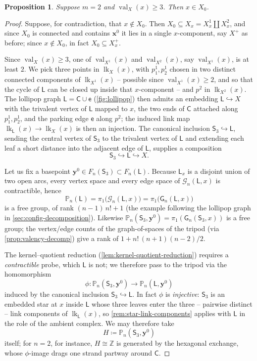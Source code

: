 \documentclass[reqno]{amsart}
\newtheorem{proposition}[theorem]{Proposition}
\theoremstyle{definition}
\newcommand\bfx{\mathbf{x}}
\newcommand\bfy{\mathbf{y}}
\newcommand\cG{\mathcal{G}}
\newcommand\sfG{\mathsf{G}}
\newcommand\sfS{\mathsf{S}}
\newcommand\sfe{\mathsf{e}}
\newcommand{\PB}{\mathbb{P}}
\newcommand{\Z}{\mathbb{Z}}
\newcommand{\base}{\bfx^0}
\newcommand{\Lollipop}{\mathsf{L}}
\DeclareMathOperator{\lk}{lk}
\DeclareMathOperator{\val}{val}
\numberwithin{equation}{section}
\begin{document}
\begin{proposition}\label{prop:X0-contains-m2-val3}
Suppose \(m=2\) and \(\val_X(x)\geq 3\). Then \(x\in X_0\).
\end{proposition}

\begin{proof}
Suppose, for contradiction, that \(x\notin X_0\). Then
\(X_0\subseteq X_x = X^1_x\coprod X^2_x\), and since \(X_0\) is
connected and contains \(\base\) it lies in a single
\(x\)-component, say \(X^+\) as before; since \(x\notin X_0\), in
fact \(X_0\subseteq X^+_x\).

Since \(\val_X(x)\geq 3\), one of \(\val_{X^1}(x)\) and
\(\val_{X^2}(x)\), say \(\val_{X^1}(x)\), is at least \(2\). We
pick three points in \(\lk_X(x)\), with \(p^1_1,p^1_2\) chosen in two
distinct connected components of \(\lk_{X^1}(x)\) -- possible since
\(\val_{X^1}(x)\geq2\), and so that the cycle of \(\Lollipop\) can be
closed up inside that \(x\)-component -- and \(p^2\) in \(\lk_{X^2}(x)\). The lollipop graph
\(\Lollipop=\mathsf{C}\cup\mathsf{\sfe}\)
(\cref{fig:lollipop}) then admits an embedding
\(\Lollipop\hookrightarrow X\) with the trivalent vertex of
\(\Lollipop\) mapped to \(x\), the two ends of \(\mathsf{C}\) attached
along \(p^1_1,p^1_2\), and the parking edge \(\mathsf{\sfe}\) along \(p^2\);
the induced link map \(\lk_{\Lollipop}(x)\to\lk_X(x)\) is then an
injection. The canonical inclusion
\(\sfS_3\hookrightarrow\Lollipop\), sending the central
vertex of \(\sfS_3\) to the trivalent vertex of \(\Lollipop\)
and extending each leaf a short distance into the adjacent edge
of \(\Lollipop\), supplies a composition
\[
\sfS_3 \hookrightarrow \Lollipop \hookrightarrow X.
\]

Let us fix a basepoint \(\bfy^0\in F_n(\sfS_3)\subset F_n(\Lollipop)\).
Because \(\Lollipop_x\) is a disjoint
union of two open arcs, every vertex space and every edge space
of \(\cG_n(\Lollipop,x)\) is contractible, hence
\[
\PB_n(\Lollipop)
=\pi_1\bigl(\cG_n(\Lollipop,x)\bigr)
=\pi_1\bigl(\sfG_n(\Lollipop,x)\bigr)
\]
is a free group, of rank \((n-1)\,n!+1\) (the example following the
lollipop graph in
\cref{sec:config-decomposition}). Likewise
\(\PB_n(\sfS_3,\bfy^0)=\pi_1(\sfG_n(\sfS_3,x))\) is
a free group; the vertex/edge counts of the graph-of-spaces of
the tripod (via \cref{prop:valency-decomp}) give a rank of
\(1 + n!\,(n+1)(n-2)/2\).

The kernel--quotient reduction
(\cref{lem:kernel-quotient-reduction}) requires a
\emph{contractible} probe, which \(\Lollipop\) is not; we
therefore pass to the tripod via the homomorphism
\[
\phi\colon
\PB_n(\sfS_3,\bfy^0)\longrightarrow
\PB_n(\Lollipop,\bfy^0)
\]
induced by the canonical inclusion
\(\sfS_3\hookrightarrow\Lollipop\). In fact \(\phi\) is
\emph{injective}: \(\sfS_3\) is an embedded star at \(x\) inside
\(\Lollipop\) whose three leaves enter the three -- pairwise
distinct -- link components of \(\lk_\Lollipop(x)\), so
\cref{rem:star-link-components} applies with \(\Lollipop\) in the
role of the ambient complex. We may therefore take
\[
H \coloneqq \PB_n(\sfS_3,\bfy^0)
\]
itself; for \(n=2\), for instance, \(H\cong\Z\) is generated by
the hexagonal exchange, whose \(\phi\)-image drags one strand
partway around \(\mathsf{C}\).


\end{proof}
\end{document}
